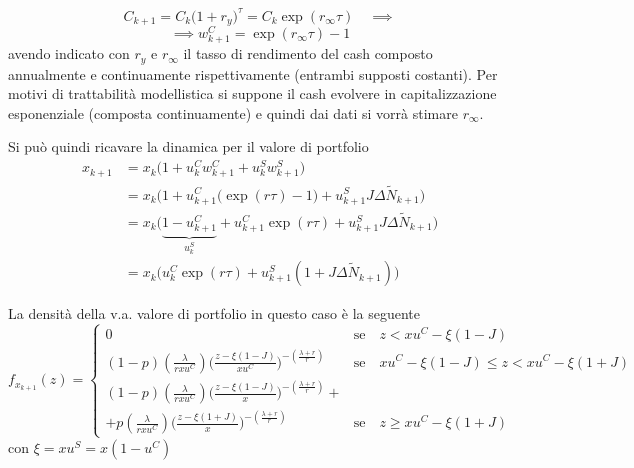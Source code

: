 \documentclass[12pt,a4paper]{article}
\theoremstyle{break}
\begin{document}
\[
C_{k+1} = C_k \Big(1 + r_y\Big)^{\tau} = C_k\exp(r_{\infty}\tau) \quad \implies
\]
\[
\implies \boxed{w^C_{k+1} = \exp(r_{\infty}\tau) - 1 }
\]
avendo indicato con $r_y$ e $r_{\infty}$ il tasso di rendimento del cash composto annualmente e continuamente rispettivamente (entrambi supposti costanti). Per motivi di trattabilità modellistica si suppone il cash evolvere in capitalizzazione esponenziale (composta continuamente) e quindi dai dati si vorrà stimare $ r_{\infty}$.

Si può quindi ricavare la dinamica per il valore di portfolio
\begin{align*}
x_{k+1} & = x_k\Big( 1 + u^C_k w^C_{k+1} + u^S_k w^S_{k+1}\Big)\\
& = x_k\Big(1 + u^C_{k+1} \big(\exp({r\tau}) -1\big) + u^S_{k+1}J\Delta \widetilde{N}_{k+1}\Big)\\
& = x_k \Big(\underbrace{1 - u^C_{k+1}}_{u^S_k} + u^C_{k+1} \exp({r\tau}) +  u^S_{k+1}J\Delta \widetilde{N}_{k+1}\Big) \\
& = x_k \Big(u^C_k\exp({r\tau}) +  u^S_{k+1}(1 + J\Delta \widetilde{N}_{k+1})\Big)
\end{align*}

La densità della v.a. valore di portfolio in questo caso è la seguente
\begin{equation}
f_{x_{k+1}}(z) = 
\begin{cases}
0 & \text{se} \quad z < x u^C - \xi(1-J)\\
(1-p)(\frac{\lambda}{r xu^C})\Big(\frac{z-\xi(1-J)}{xu^C}\Big)^{-(\frac{\lambda+r}{r})} & \text{se} \quad x u^C - \xi(1-J) \leq z < x u^C - \xi(1+J) \\
(1-p)(\frac{\lambda}{r xu^C})\Big(\frac{z-\xi(1-J)}{x}\Big)^{-(\frac{\lambda+r}{r})}+\\ + p(\frac{\lambda}{r xu^C})\Big(\frac{z-\xi(1+J)}{x}\Big)^{-(\frac{\lambda+r}{r})} & \text{se} \quad z \geq x u^C - \xi(1+J)
\end{cases}
\end{equation}
con $\xi = xu^S = x(1-u^C)$
\end{document}
